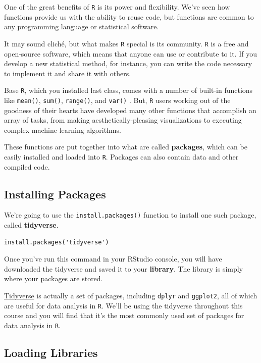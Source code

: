 \documentclass[
]{book}
\begin{document}
One of the great benefits of \texttt{R} is its power and flexibility. We've seen how functions provide us with the ability to reuse code, but functions are common to any programming language or statistical software.

It may sound cliché, but what makes \texttt{R} special is its community. \texttt{R} is a free and open-source software, which means that anyone can use or contribute to it. If you develop a new statistical method, for instance, you can write the code necessary to implement it and share it with others.

Base \texttt{R}, which you installed last class, comes with a number of built-in functions like \texttt{mean()}, \texttt{sum()}, \texttt{range()}, and \texttt{var()} . But, \texttt{R} users working out of the goodness of their hearts have developed many other functions that accomplish an array of tasks, from making aesthetically-pleasing visualizations to executing complex machine learning algorithms.

These functions are put together into what are called \textbf{packages}, which can be easily installed and loaded into \texttt{R}. Packages can also contain data and other compiled code.

\hypertarget{installing-packages}{%
\subsection{Installing Packages}\label{installing-packages}}

We're going to use the \texttt{install.packages()} function to install one such package, called \textbf{tidyverse}.

\begin{verbatim}
install.packages('tidyverse')
\end{verbatim}

Once you've run this command in your RStudio console, you will have downloaded the tidyverse and saved it to your \textbf{library}. The library is simply where your packages are stored.

\href{https://tidyverse.tidyverse.org/}{Tidyverse} is actually a set of packages, including \texttt{dplyr} and \texttt{ggplot2}, all of which are useful for data analysis in \texttt{R}. We'll be using the tidyverse throughout this course and you will find that it's the most commonly used set of packages for data analysis in \texttt{R}.

\hypertarget{loading-libraries}{%
\subsection{Loading Libraries}\label{loading-libraries}}
\end{document}
